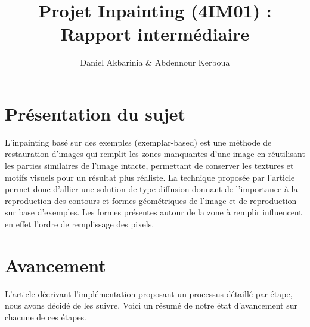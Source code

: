 \documentclass[9pt]{extarticle}
\title{\textbf{Projet Inpainting (4IM01) : Rapport intermédiaire}}
\author{Daniel Akbarinia \& Abdennour Kerboua}
\begin{document}
\maketitle

\section{Présentation du sujet}

L'inpainting basé sur des exemples (exemplar-based) est une méthode de restauration d'images qui remplit les zones manquantes d'une image en réutilisant les parties similaires de l'image intacte, permettant de conserver les textures et motifs visuels pour un résultat plus réaliste. La technique proposée par l'article permet donc d'allier une solution de type diffusion donnant de l'importance à la reproduction des contours et formes géométriques de l'image et de reproduction sur base d'exemples. Les formes présentes autour de la zone à remplir influencent en effet l'ordre de remplissage des pixels.

\section{Avancement}

L'article décrivant l'implémentation proposant un processus détaillé par étape, nous avons décidé de les suivre. Voici un résumé de notre état d'avancement sur chacune de ces étapes.
\end{document}

